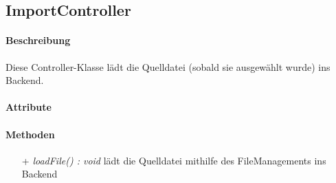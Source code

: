 \subsection{ImportController}

\paragraph{Beschreibung}
Diese Controller-Klasse lädt die Quelldatei (sobald sie ausgewählt wurde) ins Backend.


\paragraph{Attribute}

\paragraph{Methoden}
\begin{itemize}
\item[+] \textit{ loadFile() : void}
 lädt die Quelldatei mithilfe des FileManagements ins Backend  
\end{itemize}